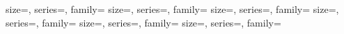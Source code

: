              {size=\LARGE,      series=\mdseries, family=\slateDisplayFont}
          {size=\large,      series=\mdseries, family=\slateDisplayFont}
        {size=\Large,      series=\mdseries, family=\slateDisplayFont}
     {size=\normalsize, series=\mdseries, family=\slateDisplayFont}
       {size=\normalsize, series=\mdseries, family=\slateDisplayFont}
  {size=\tiny,     series=\mdseries, family=\slateDisplayFont}

\usepackage{xcolor}
\usepackage{etoolbox}   %
\usepackage{tikz}
\usetikzlibrary{positioning}
\usepackage{makecell}   %
\usepackage[most]{tcolorbox}   %

